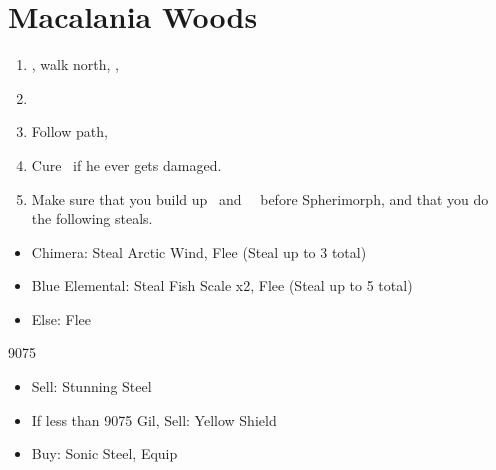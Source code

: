 \chapter{Macalania Woods}
\begin{enumerate}
	\item \sd, walk north, \sd, \save
	\item \formation{\tidus}{\rikku}{\auron}
	\item Follow path, 
	\item Cure \tidus\ if he ever gets damaged.
	\item Make sure that you build up \rikku\ and \yuna\ \od\ before Spherimorph, and that you do the following steals.
\end{enumerate}
\begin{encounters}
	\begin{itemize}
		\item Chimera: Steal Arctic Wind, Flee (Steal up to 3 total)
		\item Blue Elemental: Steal Fish Scale x2, Flee (Steal up to 5 total)
		\item Else: Flee
	\end{itemize}
\end{encounters}
\begin{shop}{9075}
	\begin{itemize}
		\item Sell: Stunning Steel
		\item If less than 9075 Gil, Sell: Yellow Shield
		\item Buy: Sonic Steel, Equip
	\end{itemize}
\end{shop}
